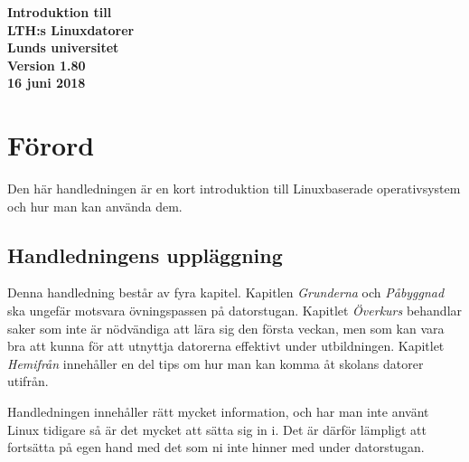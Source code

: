 \documentclass[a4paper,twocolumn]{book}
\begin{document}
\frontmatter

\begin{titlepage}
  \vspace*{30mm}
  \begin{center}
    \sffamily
    \renewcommand{\baselinestretch}{1.1}
    \Huge\bfseries Introduktion till \\[2mm]
      LTH:s Linuxdatorer \\[7mm]
    \large Lunds universitet \\[5mm]
    Version 1.80 \\
    16 juni 2018
  \end{center}
\end{titlepage}

\onecolumn
\thispagestyle{empty}
\hbox{}\vfill\noindent
\twocolumn

{\parskip 0pt%
  \tableofcontents}             %

\chapter{Förord}
\label{cha:forord}

Den här handledningen är en kort introduktion till Linuxbaserade operativsystem och 
hur man kan använda dem.

\section*{Handledningens uppläggning}

Denna handledning består av fyra kapitel. Kapitlen \emph{Grunderna} och \emph{Påbyggnad} ska ungefär
motsvara övningspassen på datorstugan. Kapitlet \emph{Överkurs}
behandlar saker som inte är nödvändiga att lära sig den första veckan,
men som kan vara bra att kunna för att utnyttja datorerna effektivt under
utbildningen. Kapitlet \emph{Hemifrån} innehåller en del tips om hur man kan
komma åt skolans datorer utifrån.

Handledningen innehåller rätt mycket information, och har man inte använt Linux
 tidigare så är det mycket att sätta sig in i.
Det är därför lämpligt att fortsätta på egen hand med det som ni
inte hinner med under datorstugan.
\end{document}
